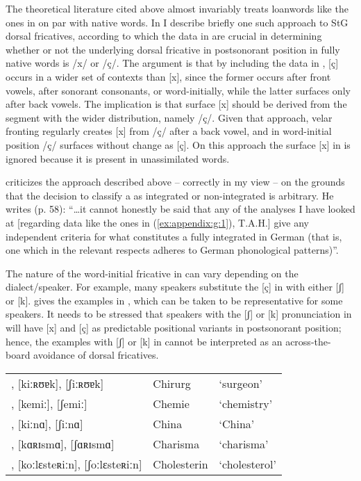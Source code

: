 The theoretical literature cited above almost invariably treats loanwords like the ones in  on par with native words. In  I describe briefly one such approach to StG dorsal fricatives, according to which the data in  are crucial in determining whether or not the underlying dorsal fricative in postsonorant position in fully native words is /x/ or /ç/. The argument is that by including the data in , [ç] occurs in a wider set of contexts than [x], since the former occurs after front vowels, after sonorant consonants, or word-initially, while the latter surfaces only after back vowels. The implication is that surface [x] should be derived from the segment with the wider distribution, namely /ç/. Given that approach, velar fronting regularly creates [x] from /ç/ after a back vowel, and in word-initial position /ç/ surfaces without change as [ç]. On this approach the surface [x] in  is ignored because it is present in unassimilated words.

\citet{Robinson2001} criticizes the approach described above -- correctly in my view -- on the grounds that the decision to classify a  as integrated or non-integrated is arbitrary. He writes (p. 58): “…it cannot honestly be said that any of the analyses I have looked at [regarding data like the ones in (\ref{ex:appendix:g:1}), T.A.H.] give any independent criteria for what constitutes a fully integrated  in German (that is, one which in the relevant respects adheres to German phonological patterns)”.

The nature of the word-initial fricative in  can vary depending on the dialect/speaker. For example, many speakers substitute the [ç] in  with either [ʃ] or [k]. \citet[222]{Noske1997} gives the examples in , which can be taken to be representative for some speakers. It needs to be stressed that speakers with the [ʃ] or [k] pronunciation in  will have [x] and [ç] as predictable positional variants in postsonorant position; hence, the examples with [ʃ] or [k] in  cannot be interpreted as an across-the-board avoidance of dorsal fricatives.

\ea \label{ex:appendix:g:2}
\begin{tabular}[t]{@{}lll@{}}
\relax [çiːʀʊɐk], [kiːʀʊɐk], [ʃiːʀʊɐk] & Chirurg & ‘surgeon’\\
\relax [çemiː], [kemiː], [ʃemiː] & Chemie &  ‘chemistry’\\
\relax [çiːnɑ], [kiːnɑ], [ʃiːnɑ] & China  & ‘China’\\
\relax [çɑʀɪsmɑ], [kɑʀɪsmɑ], [ʃɑʀɪsmɑ] & Charisma  & ‘charisma’\\
\relax [çoːlɛsteʀiːn], [koːlɛsteʀiːn], [ʃoːlɛsteʀiːn] & Cholesterin & ‘cholesterol’\\
\end{tabular}
\z

